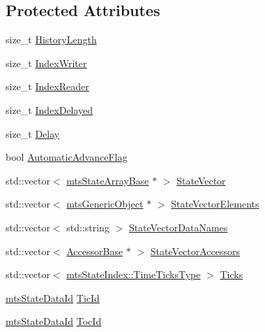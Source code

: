 \subsection*{Protected Attributes}
\begin{DoxyCompactItemize}
\item 
size\+\_\+t \hyperlink{classmts_state_table_a922d394133217df6961407a890d21913}{History\+Length}
\item 
size\+\_\+t \hyperlink{classmts_state_table_aec4f467171255f1898ec74f78f90a901}{Index\+Writer}
\item 
size\+\_\+t \hyperlink{classmts_state_table_a3735ec3378d9461a2a57028ec0e8aa70}{Index\+Reader}
\item 
size\+\_\+t \hyperlink{classmts_state_table_a21a94033326261d2aa69dec1e7000aea}{Index\+Delayed}
\item 
size\+\_\+t \hyperlink{classmts_state_table_af676579bdc8d7e1a8616708a612dbed1}{Delay}
\item 
bool \hyperlink{classmts_state_table_acbe22d62ae7c8190c92059bc50da941d}{Automatic\+Advance\+Flag}
\item 
std\+::vector$<$ \hyperlink{classmts_state_array_base}{mts\+State\+Array\+Base} $\ast$ $>$ \hyperlink{classmts_state_table_a744da952e79c0336d4208a841ae35aae}{State\+Vector}
\item 
std\+::vector$<$ \hyperlink{classmts_generic_object}{mts\+Generic\+Object} $\ast$ $>$ \hyperlink{classmts_state_table_a9752b943b66ae808210cff3fde497be3}{State\+Vector\+Elements}
\item 
std\+::vector$<$ std\+::string $>$ \hyperlink{classmts_state_table_ad7b3a968771bc125b3865a4547ec92fe}{State\+Vector\+Data\+Names}
\item 
std\+::vector$<$ \hyperlink{classmts_state_table_1_1_accessor_base}{Accessor\+Base} $\ast$ $>$ \hyperlink{classmts_state_table_a5eb62dbdd241d316b7a18ef22f68ae91}{State\+Vector\+Accessors}
\item 
std\+::vector$<$ \hyperlink{classmts_state_index_a80d0a5acdec3b616347ddea2912b6294}{mts\+State\+Index\+::\+Time\+Ticks\+Type} $>$ \hyperlink{classmts_state_table_a387cab6dc638d33ded48538d13274068}{Ticks}
\item 
\hyperlink{mts_state_table_8h_ac3a0e34e8991d51790b043fa01857a35}{mts\+State\+Data\+Id} \hyperlink{classmts_state_table_abf08ee55060e6fcc154161cec9a18fc1}{Tic\+Id}
\item 
\hyperlink{mts_state_table_8h_ac3a0e34e8991d51790b043fa01857a35}{mts\+State\+Data\+Id} \hyperlink{classmts_state_table_aa2e6cbe1e5ae5a1a58ebe3fcff10db35}{Toc\+Id}

\end{DoxyCompactItemize}
